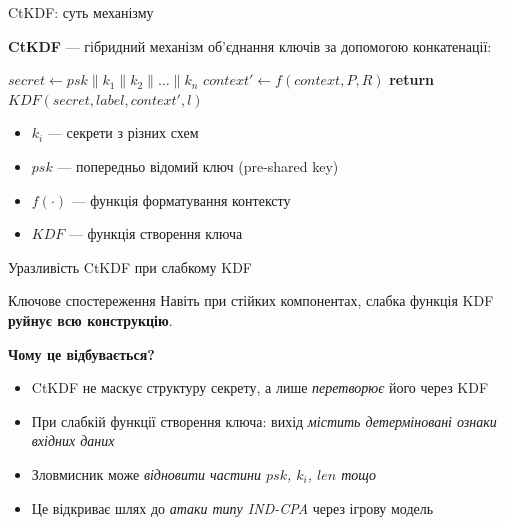\documentclass{beamer}
\begin{document}
\begin{frame}[fragile]{CtKDF: суть механізму}

\textbf{CtKDF} --- гібридний механізм об’єднання ключів за допомогою конкатенації:

\vspace{0.5em}
\begin{algorithm}[H]
 \caption{CtKDF(context, label, l, psk, k, P, R)} 
 \begin{algorithmic}
  \State $secret \gets psk \| k_1 \| k_2 \| \dots \| k_n$
  \State $context' \gets f(context, P, R)$
  \State \textbf{return} $KDF(secret, label, context', l)$
 \end{algorithmic}
\end{algorithm}

\vspace{0.5em}
\begin{itemize}
  \item $k_i$ --- секрети з різних схем
  \item $psk$ --- попередньо відомий ключ (pre-shared key)
  \item $f(\cdot)$ --- функція форматування контексту
  \item $KDF$ --- функція створення ключа 
\end{itemize}

\end{frame}



\begin{frame}{Уразливість CtKDF при слабкому KDF}

\begin{block}{Ключове спостереження}
  Навіть при стійких компонентах, слабка функція KDF \textbf{руйнує всю конструкцію}.
\end{block}

\vspace{0.5em}

\textbf{Чому це відбувається?}
\begin{itemize}
  \item CtKDF не маскує структуру секрету, а лише \textit{перетворює} його через KDF
  \item При слабкій функції створення ключа: вихід \textit{містить детерміновані ознаки вхідних даних}
  \item Зловмисник може \textit{відновити частини $psk$, $k_i$, $len$ тощо}
  \item Це відкриває шлях до \textit{атаки типу IND-CPA} через ігрову модель
\end{itemize}

\end{frame}
\end{document}
